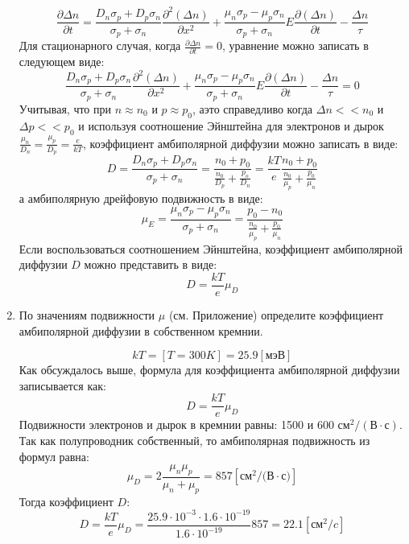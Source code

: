 \documentclass[a4paper, 12pt]{article}
\begin{document}
\begin{enumerate}
    \[
    \frac{\partial\Delta n}{\partial t}= \frac{D_n \sigma_p +D_p \sigma_n}{\sigma_p + \sigma_n} \frac{\partial^2(\Delta n)}{\partial x^2} +\frac{\mu_n \sigma_p - \mu_p \sigma_n}{\sigma_p +\sigma_n}E\frac{\partial(\Delta n)}{\partial t} - \frac{\Delta n}{\tau}    \]
    Для стационарного случая, когда $\frac{\partial\Delta n}{\partial t} = 0$, уравнение можно записать в следующем виде:
    \begin{equation}
        \frac{D_n \sigma_p +D_p \sigma_n}{\sigma_p + \sigma_n} \frac{\partial^2(\Delta n)}{\partial x^2} +\frac{\mu_n \sigma_p - \mu_p \sigma_n}{\sigma_p +\sigma_n}E\frac{\partial(\Delta n)}{\partial t} - \frac{\Delta n}{\tau} = 0
    \end{equation}
    Учитывая, что при $n \approx n_0$ и $p \approx p_0$,  аэто справедливо когда $\Delta n <<n_0 $ и $\Delta p << p_0 $ и используя соотношение Эйнштейна для электронов и дырок $\frac{\mu_n}{D_n} = \frac{\mu_p}{D_p} = \frac{e}{kT}$, коэффициент амбиполярной диффузии можно записать в виде:
    \begin{equation}
        D = \frac{D_n \sigma_p + D_p \sigma_n}{\sigma_p + \sigma_n} = \frac{n_0+p_0}{\frac{n_0}{D_p}+ \frac{p_o}{D_n}} = \frac{kT}{e}\frac{n_0+p_0}{\frac{n_0}{\mu_p}+\frac{p_0}{\mu_n}}
    \end{equation}
    а амбиполярную дрейфовую подвижность в виде:
    \begin{equation}
        \mu_E = \frac{\mu_n \sigma_p - \mu_p \sigma_n}{\sigma_p +\sigma_n} = \frac{p_0-n_0}{\frac{n_0}{\mu_p} + \frac{p_0}{\mu_n}}     
    \end{equation}
    Если воспользоваться соотношением Эйнштейна, коэффициент амбиполярной диффузии $D $ можно представить в виде:
    \[
    D = \frac{kT}{e} \mu_D
    \]
    \item По значениям подвижности  $\mu$ (см. Приложение) определите коэффициент амбиполярной диффузии в собственном кремнии.\par
    \[kT = [T=300K] = 25.9 [\text{мэВ}]\]
    Как обсуждалось выше, формула для коэффициента амбиполярной диффузии записывается как:
    \[
    D = \frac{kT}{e} \mu_D
    \]
    Подвижности электронов и дырок в кремнии равны: 1500 и 600 $\text{см}^2/(\text{В} \cdot \text{с})$. Так как полупроводник собственный, то амбиполярная подвижность из формул равна:
    \[
    \mu_D = 2\frac{\mu_n \mu_p}{\mu_n + \mu_p} = 857  [\text{см}^2/(\text{В}\cdot \text{с)}]
    \]
    Тогда коэффициент $D$:
    \[
    D = \frac{kT}{e} \mu_D = \frac{25.9 \cdot 10^{-3} \cdot 1.6 \cdot 10^{-19}}{1.6\cdot10^{-19}} 857 = 22.1 [\text{см}^2/c]
    \]
    
\end{enumerate}
\end{document}
